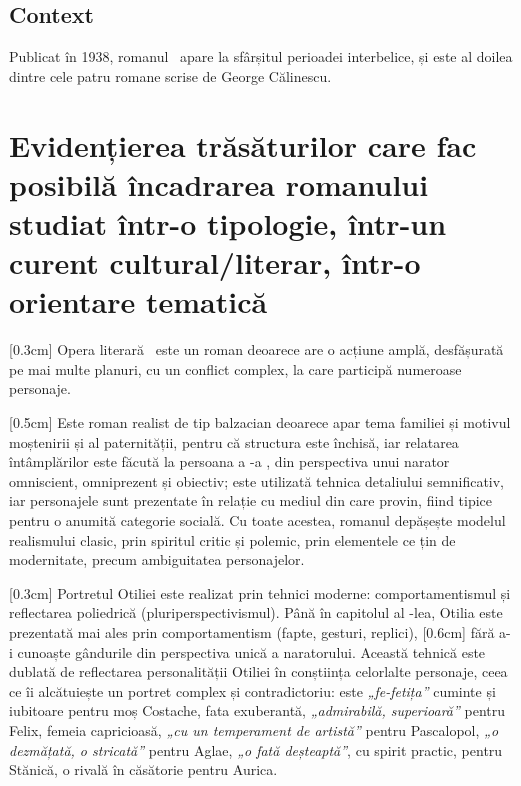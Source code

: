 \renewcommand{\operatitle}{\textbfit{„Enigma Otiliei”}} %
\renewcommand{\operaauthor}{George Călinescu} %


\subsection{Context}

Publicat în 1938, romanul \operatitle\ apare la sfârșitul perioadei interbelice, și este al doilea dintre cele patru romane scrise de \operaauthor.


\section{Evidențierea trăsăturilor care fac posibilă încadrarea romanului studiat într-o tipologie, într-un curent cultural/literar, într-o orientare tematică}

[0.3cm]
Opera literară \operatitle\ este un roman deoarece are o acțiune amplă, desfășurată pe mai multe planuri, cu un conflict complex, la care participă numeroase personaje.

[0.5cm]
Este roman realist de tip balzacian deoarece apar tema familiei și motivul moștenirii și al paternității, pentru că structura este închisă, iar relatarea întâmplărilor este făcută la persoana a -a , din perspectiva unui narator omniscient, omniprezent și obiectiv; este utilizată tehnica detaliului semnificativ, iar personajele sunt prezentate în relație cu mediul din care provin, fiind tipice pentru o anumită categorie socială. Cu toate acestea, romanul depășește modelul realismului clasic, prin spiritul critic și polemic, prin elementele ce țin de modernitate, precum ambiguitatea personajelor.

[0.3cm]
Portretul Otiliei este realizat prin tehnici moderne: comportamentismul și reflectarea poliedrică (pluriperspectivismul). Până în capitolul al -lea, Otilia este prezentată mai ales prin comportamentism (fapte, gesturi, replici),
[0.6cm]
fără a-i cunoaște gândurile din perspectiva unică a naratorului. Această tehnică este dublată de reflectarea personalității Otiliei în conștiința celorlalte personaje, ceea ce îi alcătuiește un portret complex și contradictoriu: este \textit{„fe-fetița”} cuminte și iubitoare pentru moș Costache, fata exuberantă, \textit{„admirabilă, superioară”} pentru Felix, femeia capricioasă, \textit{„cu un temperament de artistă”} pentru Pascalopol, \textit{„o dezmățată, o stricată”} pentru Aglae, \textit{„o fată deșteaptă”}, cu spirit practic, pentru Stănică, o rivală în căsătorie pentru Aurica.

